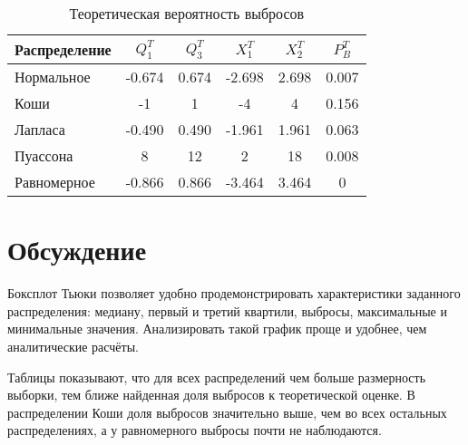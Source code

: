\documentclass[12pt,a4paper]{article}
\begin{document}
\begin{table}[H]
	\centering
	\begin{tabular}{|l|c|c|c|c|c|}
		\hline
		Распределение & $Q_1^T$	& $Q_3^T$ & $X_1^T$ & $X_2^T$ & $P_B^T$\\\hline
		\hline
		Нормальное & -0.674 & 0.674 & -2.698 &  2.698 & 0.007\\\hline
		Коши & -1 & 1 & -4 & 4 & 0.156\\\hline
		Лапласа & -0.490 & 0.490 & -1.961 & 1.961 & 0.063\\\hline
		Пуассона & 8 & 12 & 2 & 18 & 0.008\\\hline
		Равномерное & -0.866 & 0.866 & -3.464 & 3.464 & 0\\\hline
	\end{tabular}
	\caption{Теоретическая вероятность выбросов}
\end{table}

\section{Обсуждение}
Боксплот Тьюки позволяет удобно продемонстрировать характеристики заданного распределения: медиану, первый и третий квартили, выбросы, максимальные и минимальные значения. Анализировать такой график проще и удобнее, чем аналитические расчёты.

Таблицы показывают, что для всех распределений чем больше размерность выборки, тем ближе найденная доля выбросов к теоретической оценке. В распределении Коши доля выбросов значительно выше, чем во всех остальных распределениях, а у равномерного выбросы почти не наблюдаются.
\end{document}
